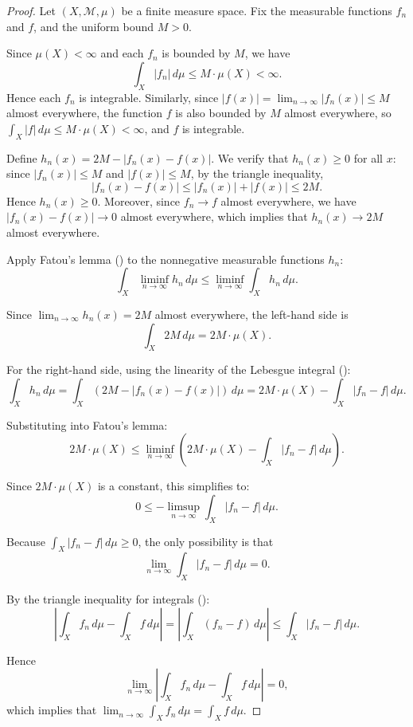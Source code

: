 \begin{proof}
    Let $(X, \mathcal{M}, \mu)$ be a finite measure space. Fix the measurable functions $f_n$ and $f$, and the uniform bound $M > 0$.

    Since $\mu(X) < \infty$ and each $f_n$ is bounded by $M$, we have
    $$\int_X |f_n|\,d\mu \leq M \cdot \mu(X) < \infty.$$
    Hence each $f_n$ is integrable. Similarly, since $|f(x)| = \lim_{n \to \infty} |f_n(x)| \leq M$ almost everywhere, the function $f$ is also bounded by $M$ almost everywhere, so $\int_X |f|\,d\mu \leq M \cdot \mu(X) < \infty$, and $f$ is integrable.

    Define $h_n(x) = 2M - |f_n(x) - f(x)|$. We verify that $h_n(x) \geq 0$ for all $x$: since $|f_n(x)| \leq M$ and $|f(x)| \leq M$, by the triangle inequality,
    $$|f_n(x) - f(x)| \leq |f_n(x)| + |f(x)| \leq 2M.$$
    Hence $h_n(x) \geq 0$. Moreover, since $f_n \to f$ almost everywhere, we have $|f_n(x) - f(x)| \to 0$ almost everywhere, which implies that $h_n(x) \to 2M$ almost everywhere.

    Apply Fatou's lemma () to the nonnegative measurable functions $h_n$:
    $$\int_X \liminf_{n \to \infty} h_n \, d\mu \leq \liminf_{n \to \infty} \int_X h_n \, d\mu.$$

    Since $\lim_{n \to \infty} h_n(x) = 2M$ almost everywhere, the left-hand side is
    $$\int_X 2M \, d\mu = 2M \cdot \mu(X).$$

    For the right-hand side, using the linearity of the Lebesgue integral ():
    $$\int_X h_n \, d\mu = \int_X (2M - |f_n(x) - f(x)|)\,d\mu = 2M \cdot \mu(X) - \int_X |f_n - f|\,d\mu.$$

    Substituting into Fatou's lemma:
    $$2M \cdot \mu(X) \leq \liminf_{n \to \infty} \left(2M \cdot \mu(X) - \int_X |f_n - f|\,d\mu\right).$$

    Since $2M \cdot \mu(X)$ is a constant, this simplifies to:
    $$0 \leq -\limsup_{n \to \infty} \int_X |f_n - f|\,d\mu.$$

    Because $\int_X |f_n - f|\,d\mu \geq 0$, the only possibility is that
    $$\lim_{n \to \infty} \int_X |f_n - f|\,d\mu = 0.$$

    By the triangle inequality for integrals ():
    $$\left|\int_X f_n \, d\mu - \int_X f \, d\mu\right| = \left|\int_X (f_n - f)\,d\mu\right| \leq \int_X |f_n - f|\,d\mu.$$

    Hence
    $$\lim_{n \to \infty} \left|\int_X f_n \, d\mu - \int_X f \, d\mu\right| = 0,$$
    which implies that $\lim_{n \to \infty} \int_X f_n \, d\mu = \int_X f \, d\mu$.
\end{proof}
